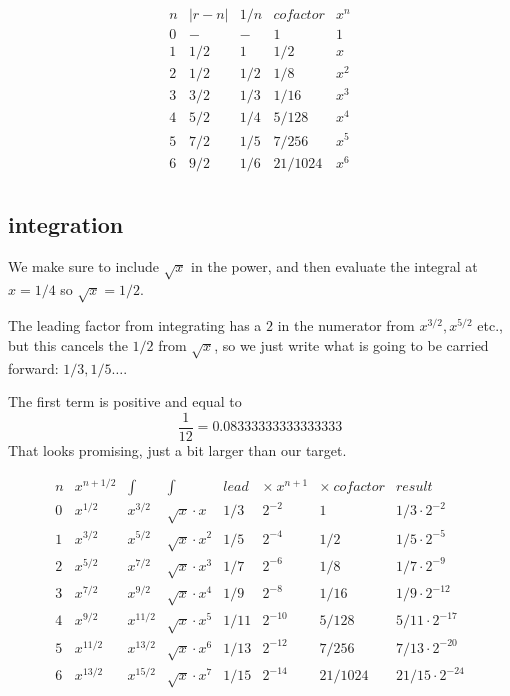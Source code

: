 \documentclass[11pt, oneside]{article}
\begin{document}
\[
\begin{matrix}
n & |r-n| & 1/n & cofactor & x^n  \\
0  & - & - & 1 & 1 \\
1 & 1/2 & 1 & 1/2 & x \\
2 & 1/2 & 1/2 & 1/8 & x^2  \\
3 & 3/2 & 1/3 &  1/16 & x^3  \\
4 & 5/2 & 1/4 &  5/128 & x^4  \\
5 & 7/2  & 1/5 &  7/256  & x^5 \\
6 & 9/2  & 1/6 &  21/1024  & x^6  \\
\end{matrix}
\] 

\subsection*{integration}

We make sure to include $\sqrt{x}$ in the power, and then evaluate the integral at $x = 1/4$ so $\sqrt{x} = 1/2$.

The leading factor from integrating has a $2$ in the numerator from $x^{3/2}, x^{5/2}$ etc., but this cancels the $1/2$ from $\sqrt{x}$, so we just write what is going to be carried forward:  $1/3, 1/5 \dots$.

The first term is positive and equal to 
\[ \frac{1}{12} = 0.08333333333333333 \]
That looks promising, just a bit larger than our target.

\[
\begin{matrix}
n & x^{n+1/2} & \int & \int & lead & \times \ x^{n+1} & \times \ cofactor & result  \\
0  & x^{1/2} & x^{3/2}  &\sqrt{x} \cdot x & 1/3 & 2^{-2} & 1 & 1/3 \cdot 2^{-2} \\
1  & x^{3/2} & x^{5/2}  & \sqrt{x} \cdot x^2 & 1/5 & 2^{-4} & 1/2 & 1/5 \cdot 2^{-5} \\
2  & x^{5/2}  & x^{7/2}  & \sqrt{x} \cdot x^3 & 1/7 & 2^{-6} & 1/8 &  1/7 \cdot 2^{-9}  \\
3  & x^{7/2}  & x^{9/2}  & \sqrt{x} \cdot x^4 & 1/9 & 2^{-8} &  1/16 & 1/9 \cdot  2^{-12}  \\
4  & x^{9/2} & x^{11/2}  & \sqrt{x} \cdot x^5 & 1/11 & 2^{-10} &  5/128 & 5/11 \cdot 2^{-17}  \\
5  & x^{11/2} & x^{13/2}  & \sqrt{x} \cdot x^6  & 1/13 & 2^{-12} &  7/256  &  7/13 \cdot 2^{-20} \\
6  & x^{13/2} & x^{15/2}  & \sqrt{x} \cdot x^7  & 1/15 & 2^{-14} &  21/1024  &  21/15 \cdot 2^{-24}  \\
\end{matrix}
\] 
\end{document}
